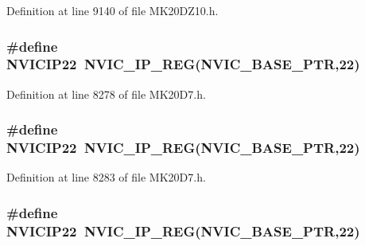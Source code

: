 Definition at line 9140 of file M\+K20\+D\+Z10.\+h.

\subsubsection[{\texorpdfstring{N\+V\+I\+C\+I\+P22}{NVICIP22}}]{\setlength{\rightskip}{0pt plus 5cm}\#define N\+V\+I\+C\+I\+P22~{\bf N\+V\+I\+C\+\_\+\+I\+P\+\_\+\+R\+EG}({\bf N\+V\+I\+C\+\_\+\+B\+A\+S\+E\+\_\+\+P\+TR},22)}\hypertarget{group___n_v_i_c___register___accessor___macros_gafa8ca30d89e9436c5ea7eeccce03f1e3}{}\label{group___n_v_i_c___register___accessor___macros_gafa8ca30d89e9436c5ea7eeccce03f1e3}


Definition at line 8278 of file M\+K20\+D7.\+h.

\subsubsection[{\texorpdfstring{N\+V\+I\+C\+I\+P22}{NVICIP22}}]{\setlength{\rightskip}{0pt plus 5cm}\#define N\+V\+I\+C\+I\+P22~{\bf N\+V\+I\+C\+\_\+\+I\+P\+\_\+\+R\+EG}({\bf N\+V\+I\+C\+\_\+\+B\+A\+S\+E\+\_\+\+P\+TR},22)}\hypertarget{group___n_v_i_c___register___accessor___macros_gafa8ca30d89e9436c5ea7eeccce03f1e3}{}\label{group___n_v_i_c___register___accessor___macros_gafa8ca30d89e9436c5ea7eeccce03f1e3}


Definition at line 8283 of file M\+K20\+D7.\+h.

\subsubsection[{\texorpdfstring{N\+V\+I\+C\+I\+P22}{NVICIP22}}]{\setlength{\rightskip}{0pt plus 5cm}\#define N\+V\+I\+C\+I\+P22~{\bf N\+V\+I\+C\+\_\+\+I\+P\+\_\+\+R\+EG}({\bf N\+V\+I\+C\+\_\+\+B\+A\+S\+E\+\_\+\+P\+TR},22)}\hypertarget{group___n_v_i_c___register___accessor___macros_gafa8ca30d89e9436c5ea7eeccce03f1e3}{}\label{group___n_v_i_c___register___accessor___macros_gafa8ca30d89e9436c5ea7eeccce03f1e3}


